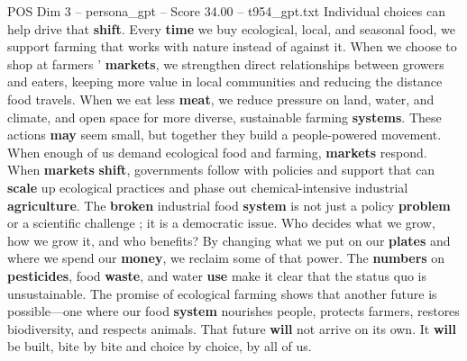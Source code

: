 \begin{textsample}{POS Dim 3 – persona\_gpt – Score 34.00 – t954\_gpt.txt}
Individual choices can help drive that \textbf{shift}.
Every \textbf{time} we buy ecological, local, and seasonal food, we support farming that works with nature instead of against it.
When we choose to shop at farmers ’ \textbf{markets}, we strengthen direct relationships between growers and eaters, keeping more value in local communities and reducing the distance food travels.
When we eat less \textbf{meat}, we reduce pressure on land, water, and climate, and open space for more diverse, sustainable farming \textbf{systems}.
These actions \textbf{may} seem small, but together they build a people-powered movement.
When enough of us demand ecological food and farming, \textbf{markets} respond.
When \textbf{markets} \textbf{shift}, governments follow with policies and support that can \textbf{scale} up ecological practices and phase out chemical-intensive industrial \textbf{agriculture}.
The \textbf{broken} industrial food \textbf{system} is not just a policy \textbf{problem} or a scientific challenge ; it is a democratic issue.
Who decides what we grow, how we grow it, and who benefits?
By changing what we put on our \textbf{plates} and where we spend our \textbf{money}, we reclaim some of that power.
The \textbf{numbers} on \textbf{pesticides}, food \textbf{waste}, and water \textbf{use} make it clear that the status quo is unsustainable.
The promise of ecological farming shows that another future is possible—one where our food \textbf{system} nourishes people, protects farmers, restores biodiversity, and respects animals.
That future \textbf{will} not arrive on its own.
It \textbf{will} be built, bite by bite and choice by choice, by all of us.

\end{textsample}
